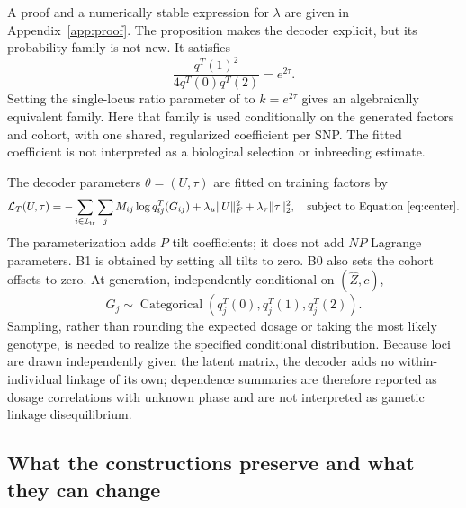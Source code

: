\documentclass[11pt,a4paper]{article}
\newcommand{\Cat}{\operatorname{Categorical}}
\newcommand{\tr}{\mathrm{tr}}
\begin{document}
A proof and a numerically stable expression for $\lambda$ are given in
Appendix~\ref{app:proof}. The proposition makes the decoder explicit, but
its probability family is not new. It satisfies
\begin{equation}
 \frac{q^T(1)^2}{4q^T(0)q^T(2)}=e^{2\tau}.
 \label{eq:odds}
\end{equation}
Setting the single-locus ratio parameter of \citet{Lachance2009} to
$k=e^{2\tau}$ gives an algebraically equivalent family. Here that family is
used conditionally on the generated factors and cohort, with one shared,
regularized coefficient per SNP. The fitted coefficient is not interpreted
as a biological selection or inbreeding estimate.

The decoder parameters $\theta=(U,\tau)$ are fitted on training factors by
\begin{equation}
 \mathcal L_T(U,\tau)
 =-\sum_{i\in\mathcal I_{\tr}}\sum_jM_{ij}
       \log q^T_{ij}(G_{ij})
   +\lambda_u\|U\|_F^2+\lambda_\tau\|\tau\|_2^2,
 \quad\text{subject to Equation~\eqref{eq:center}.}
 \label{eq:tiltobj}
\end{equation}
The parameterization adds $P$ tilt coefficients; it does not add $NP$
Lagrange parameters. B1 is obtained by setting all tilts to zero. B0 also
sets the cohort offsets to zero. At generation, independently conditional on
$(\widehat Z,c)$,
\begin{equation}
 \widehat G_j\sim\Cat\left(q^T_j(0),q^T_j(1),q^T_j(2)\right).
 \label{eq:sample}
\end{equation}
Sampling, rather than rounding the expected dosage or taking the most likely
genotype, is needed to realize the specified conditional distribution. Because
loci are drawn independently given the latent matrix, the decoder adds no
within-individual linkage of its own; dependence summaries are therefore
reported as dosage correlations with unknown phase \citep{Rogers2009} and are
not interpreted as gametic linkage disequilibrium.

\subsection{What the constructions preserve and what they can change}
\label{sec:properties}
\end{document}
